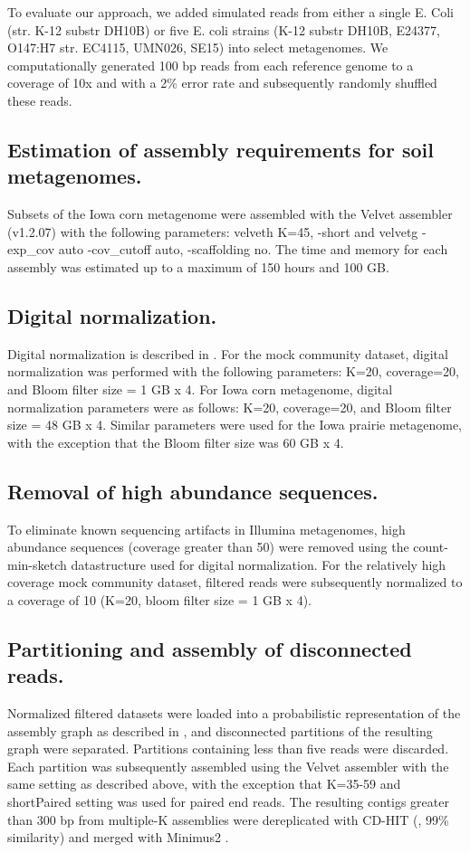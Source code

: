 \documentclass{pnastwo}
\begin{document}
\begin{article}
To evaluate our approach, we added simulated reads from either a
single E. Coli (str. K-12 substr DH10B) or five E. coli strains (K-12
substr DH10B, E24377, O147:H7 str. EC4115, UMN026, SE15) into select
metagenomes.  We computationally generated 100 bp reads from each
reference genome to a coverage of 10x and with a 2\% error rate and
subsequently randomly shuffled these reads.

\subsection*{Estimation of assembly requirements for soil metagenomes.}
Subsets of the Iowa corn metagenome were assembled with the Velvet
assembler (v1.2.07) with the following parameters: velveth K=45,
-short and velvetg -exp\_cov auto -cov\_cutoff auto, -scaffolding no.
The time and memory for each assembly was estimated up to a maximum of
150 hours and 100 GB.

\subsection*{Digital normalization.}
Digital normalization is described in \cite{browndiginorm}.  
For the mock
community dataset, digital normalization was performed with the
following parameters: K=20, coverage=20, and Bloom filter size = 1 GB
x 4.  For Iowa corn metagenome, digital normalization parameters were
as follows: K=20, coverage=20, and Bloom filter size = 48 GB x 4.
Similar parameters were used for the Iowa prairie metagenome, with the
exception that the Bloom filter size was 60 GB x 4.

\subsection*{Removal of high abundance sequences.}
To eliminate known sequencing artifacts in Illumina metagenomes, high abundance 
sequences (coverage
greater than 50) were removed using the count-min-sketch datastructure
used for digital normalization.  For the relatively high coverage mock
community dataset, filtered reads were subsequently normalized to a
coverage of 10 (K=20, bloom filter size = 1 GB x 4).

\subsection*{Partitioning and assembly of disconnected reads.}
Normalized filtered datasets were loaded into a probabilistic
representation of the assembly graph as described in \cite{Pell:2012cq}, and
disconnected partitions of the resulting graph were separated.
Partitions containing less than five reads were discarded.  Each
partition was subsequently assembled using the Velvet assembler with
the same setting as described above, with the exception that K=35-59
and shortPaired setting was used for paired end reads.  The resulting
contigs greater than 300 bp from multiple-K assemblies were
dereplicated with CD-HIT (\cite{Fu:2012jk}, 99\% similarity) and merged with
Minimus2 \cite{Sommer:2007p1253}.



\end{article}
\end{document}
